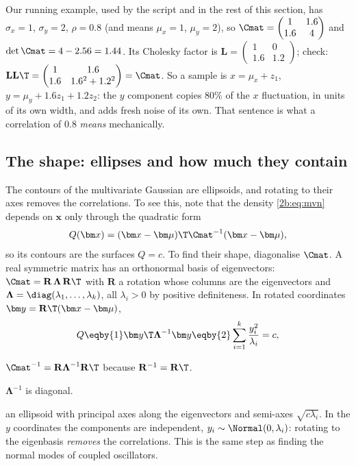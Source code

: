 Our running example, used by the script and in the rest of this section, has $\sigma_x=1$, $\sigma_y=2$, $\rho=0.8$ (and means $\mu_x=1$, $\mu_y=2$), so $\Cmat=\begin{pmatrix}1&1.6\\1.6&4\end{pmatrix}$ and $\det\Cmat=4-2.56=1.44$. Its Cholesky factor is $\mathbf L=\begin{pmatrix}1&0\\1.6&1.2\end{pmatrix}$; check: $\mathbf L\mathbf L\T=\begin{pmatrix}1&1.6\\1.6&1.6^2+1.2^2\end{pmatrix}=\Cmat$. So a sample is $x=\mu_x+z_1$, $y=\mu_y+1.6z_1+1.2z_2$: the $y$ component copies $80\%$ of the $x$ fluctuation, in units of its own width, and adds fresh noise of its own. That sentence is what a correlation of $0.8$ \emph{means} mechanically.

\subsection{The shape: ellipses and how much they contain}
\label{2b:sec:mvn-ellipse}

The contours of the multivariate Gaussian are ellipsoids, and rotating to their axes removes the correlations. To see this, note that the density \eqref{2b:eq:mvn} depends on $\bm x$ only through the quadratic form
\[
  Q(\bm x)=(\bm x-\bm\mu)\T\Cmat^{-1}(\bm x-\bm\mu),
\]
so its contours are the surfaces $Q=c$. To find their shape, diagonalise $\Cmat$. A real symmetric matrix has an orthonormal basis of eigenvectors: $\Cmat=\mathbf R\,\boldsymbol\Lambda\,\mathbf R\T$ with $\mathbf R$ a rotation whose columns are the eigenvectors and $\boldsymbol\Lambda=\diag(\lambda_1,\dots,\lambda_k)$, all $\lambda_i>0$ by positive definiteness. In rotated coordinates $\bm y=\mathbf R\T(\bm x-\bm\mu)$,
\begin{equation}
  Q\eqby{1}\bm y\T\boldsymbol\Lambda^{-1}\bm y\eqby{2}\sum_{i=1}^k\frac{y_i^2}{\lambda_i}=c ,
  \label{2b:eq:mvn-ellipse}
\end{equation}
\begin{explain}
  \item $\Cmat^{-1}=\mathbf R\boldsymbol\Lambda^{-1}\mathbf R\T$ because $\mathbf R^{-1}=\mathbf R\T$.
  \item $\boldsymbol\Lambda^{-1}$ is diagonal.
\end{explain}
an ellipsoid with principal axes along the eigenvectors and semi-axes $\sqrt{c\lambda_i}$. In the $y$ coordinates the components are independent, $y_i\sim\Normal(0,\lambda_i)$: rotating to the eigenbasis \emph{removes} the correlations. This is the same step as finding the normal modes of coupled oscillators.


